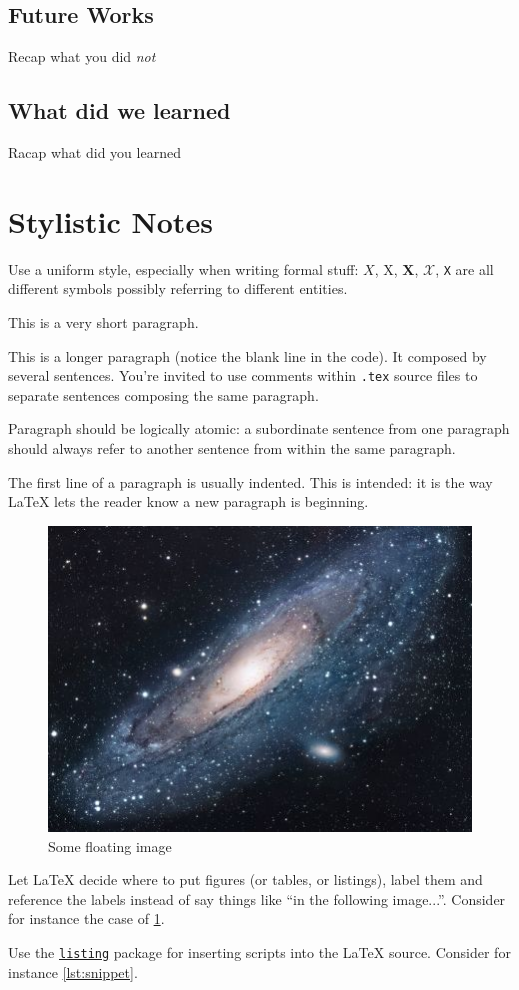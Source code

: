 \documentclass{scrartcl}
\begin{document}
\subsection{Future Works}

Recap what you did \emph{not}

\subsection{What did we learned}

Racap what did you learned

\section*{Stylistic Notes}

Use a uniform style, especially when writing formal stuff: $X$, X, $\mathbf{X}$, $\mathcal{X}$, \texttt{X} are all different symbols possibly referring to different entities. 

This is a very short paragraph.

This is a longer paragraph (notice the blank line in the code).
It composed by several sentences.
%
You're invited to use comments within \texttt{.tex} source files to separate sentences composing the same paragraph.

Paragraph should be logically atomic: a subordinate sentence from one paragraph should always refer to another sentence from within the same paragraph.

The first line of a paragraph is usually indented.
%
This is intended: it is the way \LaTeX{} lets the reader know a new paragraph is beginning.

\begin{figure} %
    \centering
    \includegraphics[width=0.5\linewidth]{figures/universe.jpg}
    \caption{Some floating image}
    \label{fig:image} 
\end{figure}

Let \LaTeX{} decide where to put figures (or tables, or listings), label them and reference the labels instead of say things like ``in the following image...''.
%
Consider for instance the case of \cref{fig:image}.

Use the \href{https://en.wikibooks.org/wiki/LaTeX/Source_Code_Listings}{\texttt{listing}} package for inserting scripts into the \LaTeX{} source.
%
Consider for instance \cref{lst:snippet}.


\nocite{*} %


\end{document}
